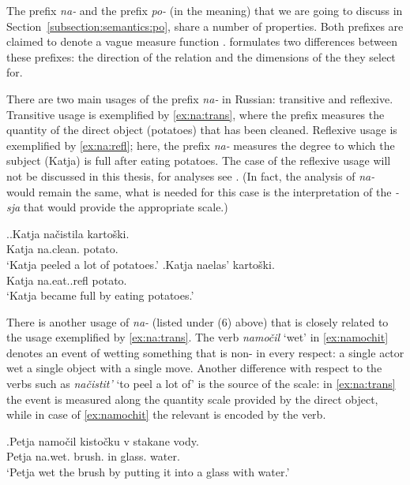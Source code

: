 The  prefix \textit{na-} and the prefix \textit{po-} (in the  meaning) that we are going to discuss in Section~\ref{subsection:semantics:po}, share a number of properties. Both prefixes are claimed to denote a vague measure function \citep{Filip:00, Souchkova:04}. \citet{Souchkova:04} formulates two differences between these prefixes: the direction of the relation and the dimensions of the  they select for.

There are two main usages of the  prefix \textit{na-} in Russian: transitive and reflexive. Transitive usage is exemplified by \ref{ex:na:trans}, where the prefix measures the quantity of the direct object (potatoes) that has been cleaned. Reflexive usage is exemplified by \ref{ex:na:refl}; here, the prefix \textit{na-} measures the degree to which the subject (Katja) is full after eating potatoes. The case of the reflexive usage will not be discussed in this thesis, for analyses see \citet{KaganPereltsvaig:11a,KaganPereltsvaig:11b,Souchkova:04,Filip:00,Filip:05}. (In fact, the analysis of \textit{na-} would remain the same, what is needed for this case is the interpretation of the  \textit{-sja} that would provide the appropriate scale.)

\ex.\ag.\label{ex:na:trans}Katja na\v{c}istila karto\v{s}ki.\\
Katja na.clean. potato.\\
\trans `Katja peeled a lot of potatoes.'
\bg.\label{ex:na:refl}Katja naelas' karto\v{s}ki.\\
Katja na.eat..refl potato.\\
\trans `Katja became full by eating potatoes.'

There is another usage of \textit{na-} (listed under (6) above) that is closely related to the  usage exemplified by \ref{ex:na:trans}. The verb \textit{namo\v{c}il} `wet' in \ref{ex:namochit} denotes an event of wetting something that is non- in every respect: a single actor wet a single object with a single move. Another difference with respect to the verbs such as \textit{na\v{c}istit'} `to peel a lot of' is the source of the scale: in \ref{ex:na:trans} the event is measured along the quantity scale provided by the direct object, while in case of \ref{ex:namochit} the relevant  is encoded by the verb.

\exg.\label{ex:namochit}Petja namo\v{c}il kisto\v{c}ku v stakane vody.\\
Petja na.wet. brush. in glass. water.\\
\trans `Petja wet the brush by putting it into a glass with water.'

